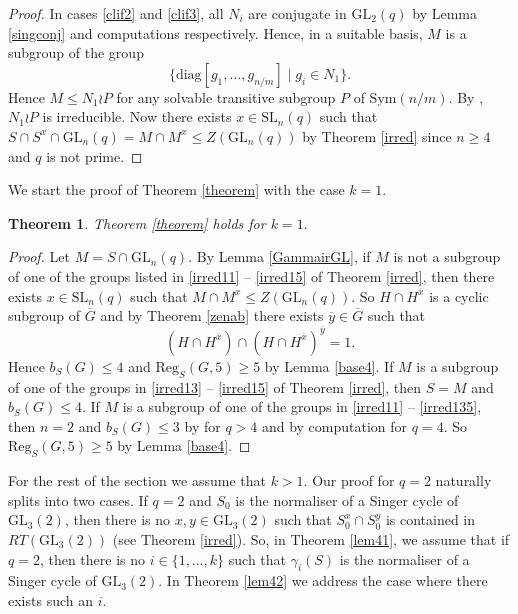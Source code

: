 \documentclass[a4paper,reqno,11pt]{amsart}
\newtheorem{Th}{Theorem}[section]
\theoremstyle{definition}
\theoremstyle{remark}
\numberwithin{equation}{section}
\newcommand{\Sym}{\mathrm{Sym}}
\newcommand{\diag}{\mathrm{diag}}
\newcommand{\Reg}{\mathrm{Reg}}
\newcommand{\SL}{{\mathrm{SL}}}
\newcommand{\GL}{{\mathrm{GL}}}
\begin{document}
\begin{proof}
 In cases \ref{clif2} and \ref{clif3}, all $N_i$ are conjugate in $\GL_2(q)$ by  Lemma \ref{singconj} and computations respectively. Hence, in a suitable basis, $M$ is a subgroup of the group
$$\{\diag[g_1, \ldots, g_{n/m}] \mid g_i \in N_1\}.$$ Hence $M \le N_1 \wr P$ for any solvable transitive subgroup $P$ of $\Sym(n/m).$ By \cite[Lemma 4,\S15]{sup}, $N_1 \wr P$ is irreducible. Now there exists  $x \in \SL_n(q)$ such that $S \cap S^x \cap \GL_n(q)=M \cap M^x \le Z(\GL_n(q))$ by Theorem \ref{irred} since $n\ge 4$ and $q$ is not prime.  
 \end{proof}
 
 We start the proof of Theorem \ref{theorem} with the case $k=1.$ 
 
 
\begin{Th}
Theorem {\rm \ref{theorem}} holds for $k=1.$ 
\end{Th}
\begin{proof}
Let $M = S \cap \GL_n(q)$. By Lemma \ref{GammairGL}, if $M$ is not a subgroup of one of the groups listed in  \ref{irred11} -- \ref{irred15} of Theorem \ref{irred}, then there exists $x \in \SL_n(q)$ such that $M \cap M^x \le Z(\GL_n(q)).$ So $H \cap H^{\overline{x}}$ is a cyclic subgroup of $\overline{G}$ and by Theorem \ref{zenab} there exists $\overline{y} \in \overline{G}$ such that 
$$(H \cap H^{\overline{x}}) \cap (H \cap H^{\overline{x}})^{\overline{y}}=1.$$ Hence $b_S(G) \le 4$ and $\Reg_S(G,5) \ge 5$ by Lemma \ref{base4}.
If  $M$ is a subgroup of one of the groups in \ref{irred13} -- \ref{irred15} of Theorem \ref{irred}, then $S=M$ and $b_S(G) \le 4.$ If  $M$ is a subgroup of one of the groups in \ref{irred11} -- \ref{irred135}, then $n=2$ and $b_S(G) \le 3$ by \cite[Table 3]{burness}  for $q>4$ and by computation for $q=4$.  So $\Reg_S(G,5) \ge 5$ by Lemma \ref{base4}.
\end{proof}


 For the rest of the section we assume that $k>1.$ Our proof for $q=2$ naturally splits into two cases.  If $q=2$ and $S_0$ is the normaliser of a Singer cycle of $\GL_3(2)$, then there is no $x, y \in \GL_3(2)$ such that $S_0^{x} \cap S_0^{y}$ is contained in $RT(\GL_3(2))$ (see Theorem \ref{irred}). So, in Theorem \ref{lem41}, we assume that if $q=2$, then there is no  $i \in \{1, \ldots, k\}$ such that $\gamma_i(S)$ is the normaliser of a Singer cycle of $\GL_3(2).$ In Theorem \ref{lem42} we address the case where there exists such an $i$.
\end{document}
